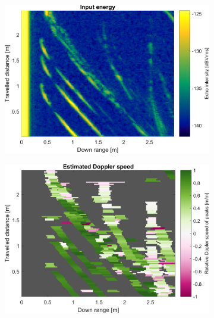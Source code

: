\begin{figure}[htbp]
    \centering
    \begin{subfigure}[t]{0.475\linewidth}
        \centering
        \includegraphics[width=\linewidth,max height=.475\textheight]{gfx/results/falloutshelter_input.png}
    \end{subfigure}%
    \hfill%
    \begin{subfigure}[t]{0.475\linewidth}  
        \centering 
        \includegraphics[width=\linewidth,max height=.475\textheight]{gfx/results/falloutshelter_doppler.png}
    \end{subfigure}\bigskip\\
    \begin{subfigure}[t]{0.5\linewidth}   
        \centering 

\end{subfigure}
\end{figure}
